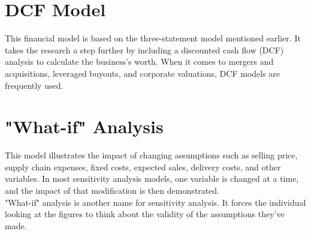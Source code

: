 \documentclass{article}
\begin{document}
\section{DCF Model}
This financial model is based on the three-statement model mentioned earlier. It takes the research a step further by including a discounted cash flow (DCF) analysis to calculate the business's worth. When it comes to mergers and acquisitions, leveraged buyouts, and corporate valuations, DCF models are frequently used.

\section{"What-if" Analysis}
This model illustrates the impact of changing assumptions such as selling price, supply chain expenses, fixed costs, expected sales, delivery costs, and other variables. In most sensitivity analysis models, one variable is changed at a time, and the impact of that modification is then demonstrated.
\\
"What-if" analysis is another name for sensitivity analysis. It forces the individual looking at the figures to think about the validity of the assumptions they've made.
\end{document}
